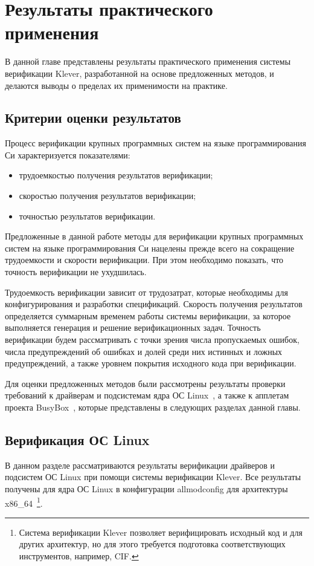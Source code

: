 \chapter{Результаты практического применения}

В данной главе представлены результаты практического применения системы верификации Klever, разработанной на основе предложенных методов, и делаются выводы о пределах их применимости на практике.

\section{Критерии оценки результатов}
Процесс верификации крупных программных систем на языке программирования Си характеризуется показателями:
\begin{itemize}
    \item трудоемкостью получения результатов верификации;
    \item скоростью получения результатов верификации;
    \item точностью результатов верификации.
\end{itemize}

Предложенные в данной работе методы для верификации крупных программных систем на языке программирования Си нацелены прежде всего на сокращение трудоемкости и скорости верификации.
При этом необходимо показать, что точность верификации не ухудшилась.

Трудоемкость верификации зависит от трудозатрат, которые необходимы для конфигурирования и разработки спецификаций.
Скорость получения результатов определяется суммарным временем работы системы верификации, за которое выполняется генерация и решение верификационных задач.
Точность верификации будем рассматривать с точки зрения числа пропускаемых ошибок, числа предупреждений об ошибках и долей среди них истинных и ложных предупреждений, а также уровнем покрытия исходного кода при верификации.

Для оценки предложенных методов были рассмотрены результаты проверки требований к драйверам и подсистемам ядра ОС Linux~\cite{linux}, а также к апплетам проекта BusyBox~\cite{busybox}, которые представлены в следующих разделах данной главы. 

\section{Верификация ОС Linux}

В данном разделе рассматриваются результаты верификации драйверов и подсистем ОС Linux при помощи системы верификации Klever.
Все результаты получены для ядра ОС Linux в конфигурации allmodconfig для архитектуры x86\_64~\footnote{Система верификации Klever позволяет верифицировать исходный код и для других архитектур, но для этого требуется подготовка соответствующих инструментов, например, CIF.}.

